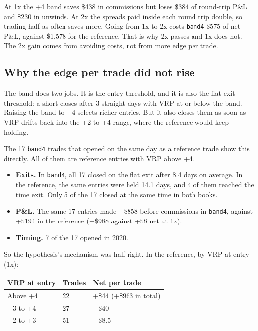 \documentclass{article}
\begin{document}
At 1x the +4 band saves \$438 in commissions but loses \$384 of round-trip P\&L and \$230 in unwinds. At 2x the spreads paid inside each round trip double, so trading half as often saves more. Going from 1x to 2x costs \texttt{band4} \$575 of net P\&L, against \$1,578 for the reference. That is why 2x passes and 1x does not. The 2x gain comes from avoiding costs, not from more edge per trade.

\subsection{Why the edge per trade did not rise}

The band does two jobs. It is the entry threshold, and it is also the flat-exit threshold: a short closes after 3 straight days with VRP at or below the band. Raising the band to +4 selects richer entries. But it also closes them as soon as VRP drifts back into the +2 to +4 range, where the reference would keep holding.

The 17 \texttt{band4} trades that opened on the same day as a reference trade show this directly. All of them are reference entries with VRP above +4.

\begin{itemize}

\item \textbf{Exits.} In \texttt{band4}, all 17 closed on the flat exit after 8.4 days on average. In the reference, the same entries were held 14.1 days, and 4 of them reached the time exit. Only 5 of the 17 closed at the same time in both books.

\item \textbf{P\&L.} The same 17 entries made \ensuremath{-}\$858 before commissions in \texttt{band4}, against +\$194 in the reference (\ensuremath{-}\$988 against +\$8 net at 1x).

\item \textbf{Timing.} 7 of the 17 opened in 2020.

\end{itemize}

So the hypothesis's mechanism was half right. In the reference, by VRP at entry (1x):

\begin{center}\small
\begin{tabularx}{\linewidth}{l l >{\raggedright\arraybackslash}X}
\toprule
\textbf{VRP at entry} & \textbf{Trades} & \textbf{Net per trade} \\
\midrule
Above +4 & 22 & +\$44 (+\$963 in total) \\
+3 to +4 & 27 & \ensuremath{-}\$40 \\
+2 to +3 & 51 & \ensuremath{-}\$8.5 \\
\bottomrule
\end{tabularx}
\end{center}
\end{document}
